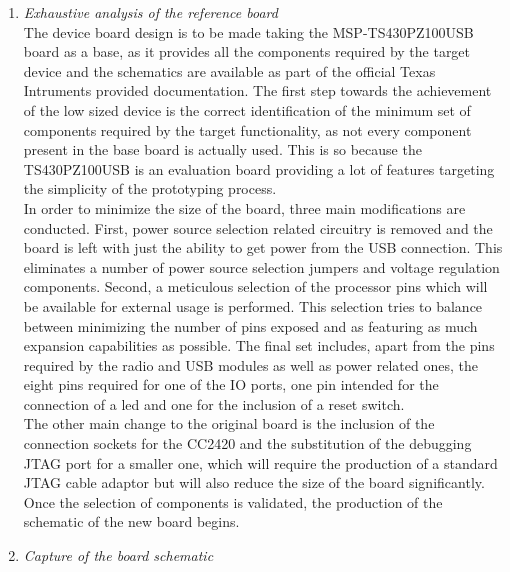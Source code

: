 			\begin{enumerate}
			\item \emph{Exhaustive analysis of the reference board}\\

				The device board design is to be made taking the MSP-TS430PZ100USB board as a base, as it provides all the components required by the target device and the schematics are available as part of the official Texas Intruments provided documentation. The first step towards the achievement of the low sized device is the correct identification of the minimum set of components required by the target functionality, as not every component present in the base board is actually used. This is so because the TS430PZ100USB is an evaluation board providing a lot of features targeting the simplicity of the prototyping process.\\

				In order to minimize the size of the board, three main modifications are conducted. First, power source selection related circuitry is removed and the board is left with just the ability to get power from the USB connection. This eliminates a number of power source selection jumpers and voltage regulation components. Second, a meticulous selection of the processor pins which will be available for external usage is performed. This selection tries to balance between minimizing the number of pins exposed and as featuring as much expansion capabilities as possible. The final set includes, apart from the pins required by the radio and USB modules as well as power related ones, the eight pins required for one of the IO ports, one pin intended for the connection of a led and one for the inclusion of a reset switch.\\

				The other main change to the original board is the inclusion of the connection sockets for the CC2420 and the substitution of the debugging JTAG port for a smaller one, which will require the production of a standard JTAG cable adaptor but will also reduce the size of the board significantly.\\

				Once the selection of components is validated, the production of the schematic of the new board begins.\\

			\item \emph{Capture of the board schematic}\\
		

\end{enumerate}
